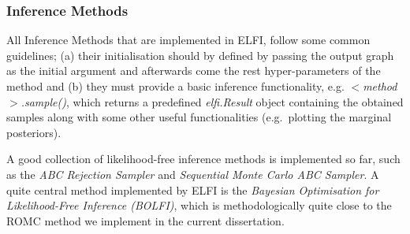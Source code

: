 \subsubsection{Inference Methods}
\label{sec:inference-methods}

All Inference Methods that are implemented in ELFI, follow some common
guidelines; (a) their initialisation should by defined by passing the
output graph as the initial argument and afterwards come the rest
hyper-parameters of the method and (b) they must provide a basic
inference functionality, e.g. $<$\textit{method}$>$\textit{.sample()},
which returns a predefined \textit{elfi.Result} object containing the
obtained samples along with some other useful functionalities
(e.g.\ plotting the marginal posteriors).

A good collection of likelihood-free inference methods is implemented
so far, such as the \textit{ABC Rejection Sampler} and
\textit{Sequential Monte Carlo ABC Sampler}. A quite central method
implemented by ELFI is the \textit{Bayesian Optimisation for
  Likelihood-Free Inference (BOLFI)}, which is methodologically quite
close to the ROMC method we implement in the current dissertation.



